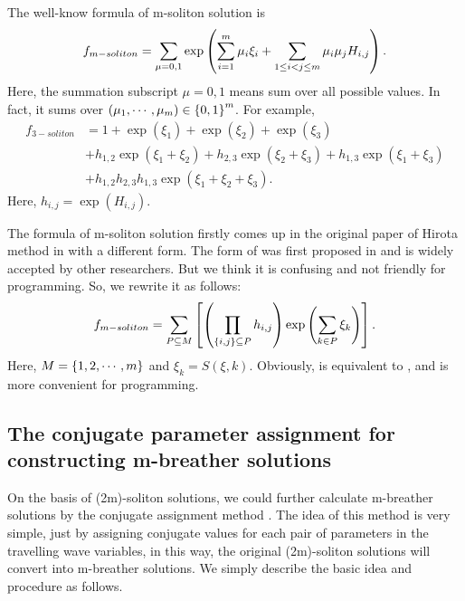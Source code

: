 The well-know formula of m-soliton solution is \cite{hirota1973exact}
\begin{equation}
    f_{m-soliton}=\sum_{\mu=0,1}\exp\left(\sum_{i=1}^m{\mu_i \xi_i}+\sum_{1\le i<j\le m}{\mu_i\mu_jH_{i,j}}\right). \label{f-soliton-old}
\end{equation}
Here, the summation subscript $\mu=0,1$ means sum over all possible values. In fact, it sums over $\left(\mu_1,\cdots,\mu_m\right)\in \left\{0,1\right\}^m$. For example, 
\begin{equation}
\begin{split}
f_{3-soliton}&=1+\exp(\xi_1)+\exp(\xi_2)+\exp(\xi_3)\\
&+h_{1,2}\exp(\xi_1+\xi_2)+h_{2,3}\exp(\xi_2+\xi_3)+h_{1,3}\exp(\xi_1+\xi_3)\\
&+h_{1,2}h_{2,3}h_{1,3}\exp(\xi_1+\xi_2+\xi_3).
\end{split}
\end{equation}
Here, $h_{i,j}=\exp(H_{i,j})$.

The formula of m-soliton solution firstly comes up in the original paper of Hirota method in \cite{hirota1971exact} with a different form. The form of  was first proposed in \cite{hirota1973exact} and is widely accepted by other researchers. But we think it is confusing and not friendly for programming. So, we rewrite it as follows:
\begin{equation}
    f_{m-soliton}=\sum_{P\subseteq M}\left[\left(\prod_{\left\{i,j\right\}\subseteq P}{h_{i,j}}\right)\exp\left(\sum_{k\in P}{\xi_k}\right)\right]. \label{f-soliton-new}
\end{equation}
Here, $M=\left\{1,2,\cdots,m\right\}$ and $\xi_k=S(\xi,k)$. Obviously,  is equivalent to , and  is more convenient for programming.

\subsection{The conjugate parameter assignment for constructing m-breather solutions}
On the basis of (2m)-soliton solutions, we could further calculate m-breather solutions by the conjugate assignment method \cite{tajiri1989breather}. The idea of this method is very simple, just by assigning conjugate values for each pair of parameters in the travelling wave variables, in this way, the original (2m)-soliton solutions will convert into m-breather solutions. We simply describe the basic idea and procedure as follows. 

